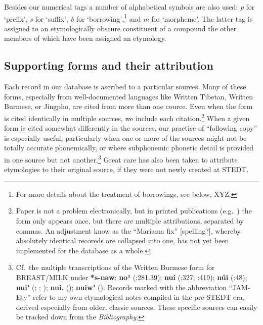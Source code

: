 Besides our numerical tags a number of alphabetical symbols are also used: \textit{p} for ‘prefix’, \textit{s} for ‘suffix’, \textit{b} for ‘borrowing’,\footnote{For more details about the treatment of borrowings, see below, XYZ.} and \textit{m} for ‘morpheme’. The latter tag is assigned to an etymologically obscure constituent of a compound the other members of which have been assigned an etymology.

\subsection{Supporting forms and their attribution}

Each record in our database is ascribed to a particular sources. Many of these forms, especially from well-documented languages like Written Tibetan, Written Burmese, or Jingpho, are cited from more than one cource. Even when the form is cited identically in multiple sources, we include each citation.\footnote{Paper is not a problem electronically, but in printed publications (e.g.\ \textit{}) the form only appears once, but there are  multiple attributions, separated by commas. An adjustment know as the “Mariama fix” [spelling?], whereby absolutely identical recoreds are collapsed into one, has not yet been implemented for the database as a whole.} When a given form is cited somewhat differently in the sources, our practice of “following copy” is especially useful, particularly when one or more of the sources might not be totally accurate phonemically, or where subphonemic phonetic detail is provided in one source but not another.\footnote{Cf.\ the
multiple transcriptions of the Written Burmese form for BREAST/MILK under
\textbf{*s-nəw}:  \textbf{no¹}
(\citealt{ZMYYC}:281.39); \textbf{nuí} (\citealt{AW-TBT}:327; \textit{}:419); \textbf{núi}
(\citealt{WSC-SH}:48); \textbf{nuiʼ} (\citealt{JAM-Ety}; \citealt{GEM-CNL}; \citealt{PKB-WBRD});
\textbf{nui.} (\citealt{GEM-CNL}); \textbf{nuiwʼ} (\citealt{GHL-PPB}). Records marked with the abbreviation “JAM-Ety” refer to my own etymological notes compiled in the pre-STEDT era, derived especially from older, classic sources. These specific sources can easily be tracked down from the \textit{Bibliography}.} Great care has also been taken to attribute etymologies to their original source, if they were not newly created at STEDT.

